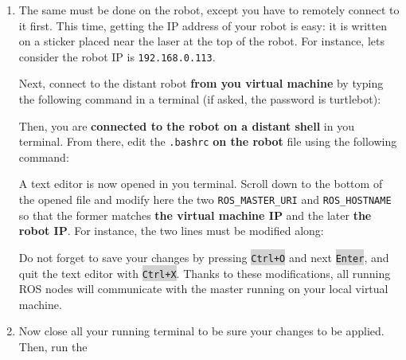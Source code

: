 \documentclass[10pt,a4paper,printanswers]{upmc}
\newcommand{\mytext}[1]{\colorbox{lightgray}{\texttt{#1}}}
\begin{document}
\begin{enumerate}
  \item The same must be done on the robot, except you have to remotely connect to it first. This
        time, getting the IP address of your robot is easy: it is written on a sticker placed near
        the laser at the top of the robot. For instance, lets consider the robot IP is
        \texttt{192.168.0.113}.

        Next, connect to the distant robot \textbf{from you virtual machine} by typing the following command in a terminal (if asked, the password is turtlebot):
        
        Then, you are \textbf{connected to the robot on a distant shell} in you terminal. From
        there, edit the \texttt{.bashrc} \textbf{on the robot} file using the following command:
        
        A text editor is now opened in you terminal. Scroll down to the bottom of the opened file and
        modify here the two \texttt{ROS\_MASTER\_URI} and \texttt{ROS\_HOSTNAME} so that the former matches
        \textbf{the virtual machine IP} and the later \textbf{the robot IP}. For instance, the two lines
        must be modified along:
        
        Do not forget to save your changes by pressing \mytext{Ctrl+O} and next \mytext{Enter}, and quit
        the text editor with \mytext{Ctrl+X}. Thanks to these modifications, all running ROS nodes will
        communicate with the master running on your local virtual machine.
  \item Now close all your running terminal to be sure your changes to be applied. Then, run the

\end{enumerate}
\end{document}
